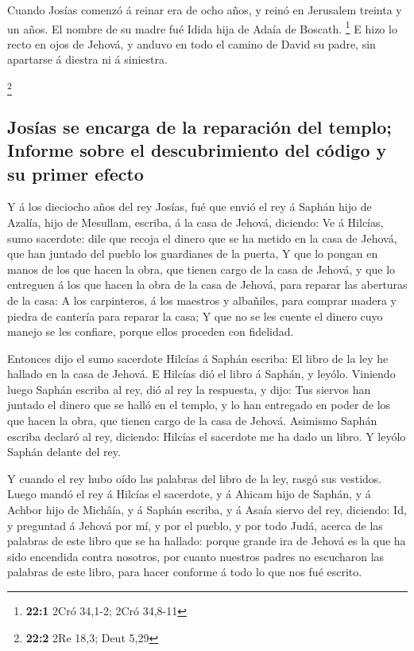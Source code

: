  Cuando Josías comenzó á reinar era de ocho años, y reinó en
Jerusalem treinta y un años. El nombre de su madre fué Idida hija de
Adaía de Boscath. \footnote{\textbf{22:1} 2Cró 34,1-2; 2Cró 34,8-11}
 E hizo lo recto en ojos de Jehová, y anduvo en todo el
camino de David su padre, sin apartarse á diestra ni á siniestra.

\footnote{\textbf{22:2} 2Re 18,3; Deut 5,29}

\hypertarget{josuxedas-se-encarga-de-la-reparaciuxf3n-del-templo-informe-sobre-el-descubrimiento-del-cuxf3digo-y-su-primer-efecto}{%
\subsection{Josías se encarga de la reparación del templo; Informe sobre
el descubrimiento del código y su primer
efecto}\label{josuxedas-se-encarga-de-la-reparaciuxf3n-del-templo-informe-sobre-el-descubrimiento-del-cuxf3digo-y-su-primer-efecto}}

 Y á los dieciocho años del rey Josías, fué que envió el rey
á Saphán hijo de Azalía, hijo de Mesullam, escriba, á la casa de Jehová,
diciendo:  Ve á Hilcías, sumo sacerdote: dile que recoja el
dinero que se ha metido en la casa de Jehová, que han juntado del pueblo
los guardianes de la puerta,  Y que lo pongan en manos de
los que hacen la obra, que tienen cargo de la casa de Jehová, y que lo
entreguen á los que hacen la obra de la casa de Jehová, para reparar las
aberturas de la casa:  A los carpinteros, á los maestros y
albañiles, para comprar madera y piedra de cantería para reparar la
casa;  Y que no se les cuente el dinero cuyo manejo se les
confiare, porque ellos proceden con fidelidad.

 Entonces dijo el sumo sacerdote Hilcías á Saphán escriba:
El libro de la ley he hallado en la casa de Jehová. E Hilcías dió el
libro á Saphán, y leyólo.  Viniendo luego Saphán escriba al
rey, dió al rey la respuesta, y dijo: Tus siervos han juntado el dinero
que se halló en el templo, y lo han entregado en poder de los que hacen
la obra, que tienen cargo de la casa de Jehová.  Asimismo
Saphán escriba declaró al rey, diciendo: Hilcías el sacerdote me ha dado
un libro. Y leyólo Saphán delante del rey.

 Y cuando el rey hubo oído las palabras del libro de la
ley, rasgó sus vestidos.  Luego mandó el rey á Hilcías el
sacerdote, y á Ahicam hijo de Saphán, y á Achbor hijo de Michâía, y á
Saphán escriba, y á Asaía siervo del rey, diciendo:  Id, y
preguntad á Jehová por mí, y por el pueblo, y por todo Judá, acerca de
las palabras de este libro que se ha hallado: porque grande ira de
Jehová es la que ha sido encendida contra nosotros, por cuanto nuestros
padres no escucharon las palabras de este libro, para hacer conforme á
todo lo que nos fué escrito.

